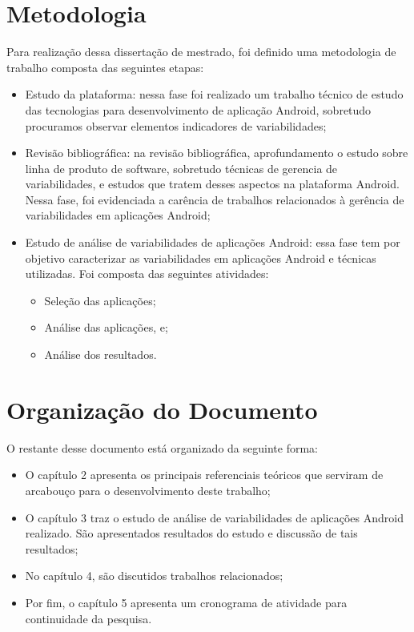 \section{Metodologia}

Para realização dessa dissertação de mestrado, foi definido uma metodologia de trabalho
composta das seguintes etapas:
\begin{itemize}
    \item Estudo da plataforma: nessa fase foi realizado um trabalho técnico de
          estudo das tecnologias para desenvolvimento de aplicação Android, sobretudo
          procuramos observar elementos indicadores de variabilidades;
    \item Revisão bibliográfica: na revisão bibliográfica, aprofundamento o estudo
          sobre linha de produto de software, sobretudo técnicas de gerencia de
          variabilidades, e estudos que tratem desses aspectos na plataforma Android.
          Nessa fase, foi evidenciada a carência de trabalhos relacionados à gerência
          de variabilidades em aplicações Android;
    \item Estudo de análise de variabilidades de aplicações Android: essa fase tem
          por objetivo caracterizar as variabilidades em aplicações Android e
          técnicas utilizadas. Foi composta das seguintes atividades:
         \begin{itemize}
            \item Seleção das aplicações;
            \item Análise das aplicações, e;
            \item Análise dos resultados.
         \end{itemize}
\end{itemize}


\section{Organização do Documento}
O restante desse documento está organizado da seguinte forma:
\begin{itemize}
    \item O capítulo 2 apresenta os principais referenciais teóricos que serviram
            de arcabouço para o desenvolvimento deste trabalho;
    \item O capítulo 3 traz o estudo de análise de variabilidades de aplicações
          Android realizado. São apresentados resultados do estudo e discussão de tais resultados;
    \item No capítulo 4, são discutidos trabalhos relacionados;
    \item Por fim, o capítulo 5 apresenta um cronograma de atividade para continuidade da pesquisa.
\end{itemize}
